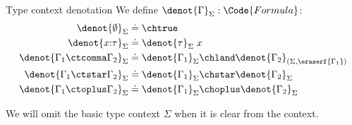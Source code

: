 \begin{definition}
\begin{definition}{Type context denotation}
  We define $\denot{\Gamma}_\Sigma: \Code{Formula}$: 
  \begin{align*}
    \denot{\emptyset}_\Sigma &\doteq \chtrue
    \\\denot{x{:}\tau}_\Sigma &\doteq \denot{\tau}_\Sigma\;x
    \\\denot{\Gamma_1 \ctcomma \Gamma_2}_\Sigma &\doteq \denot{\Gamma_1}_\Sigma \chland \denot{\Gamma_2}_{(\Sigma, \eraserf{\Gamma_1})}
    \\\denot{\Gamma_1 \ctstar \Gamma_2}_\Sigma &\doteq \denot{\Gamma_1}_\Sigma \chstar \denot{\Gamma_2}_\Sigma
    \\\denot{\Gamma_1 \ctoplus \Gamma_2}_\Sigma &\doteq \denot{\Gamma_1}_\Sigma \choplus \denot{\Gamma_2}_\Sigma
  \end{align*}\noindent
\end{definition}

We will omit the basic type context $\Sigma$ when it is clear from the context.


\end{definition}
